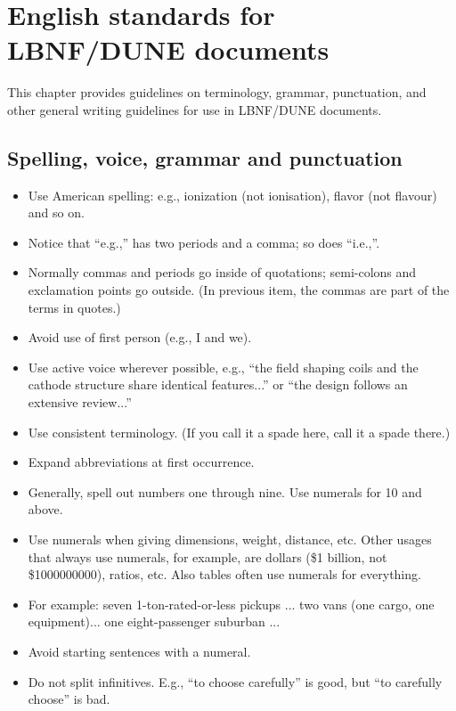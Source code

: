 \chapter{English standards for LBNF/DUNE documents}
\label{ch:english}

This chapter provides guidelines on terminology, grammar, punctuation, and other general writing guidelines for use in LBNF/DUNE documents. 


\section{Spelling, voice, grammar and punctuation}
\label{sec:english-spelling}

\begin{itemize}
\item Use American spelling: e.g., ionization (not ionisation), flavor (not flavour) and so on.
\item Notice that ``e.g.,'' has two periods and a comma; so does ``i.e.,''.
\item Normally commas and periods go inside of quotations;  semi-colons and exclamation points go outside.  (In previous item, the commas are part of the terms in quotes.)
\item Avoid use of first person (e.g., I and we). 
\item Use active voice wherever possible, e.g., ``the field shaping coils and the cathode structure share identical features...'' or ``the design follows  an extensive review...''
\item Use consistent terminology. (If you call it a spade here, call it a spade there.)
\item Expand abbreviations at first occurrence.
\item Generally, spell out numbers one through nine. Use numerals for \num{10} and above.
\item Use numerals when giving dimensions, weight, distance, etc. Other usages that always use numerals, for example, are dollars (\$1 billion, not \$\num{1000000000}), ratios, etc. Also tables often use numerals for everything.
\item For example: seven 1-ton-rated-or-less pickups ... two vans (one cargo, one equipment)... one eight-passenger suburban ...
\item Avoid starting sentences with a numeral.
\item Do not split infinitives. E.g., ``to choose carefully'' is good, but ``to carefully choose'' is bad.

\end{itemize}
